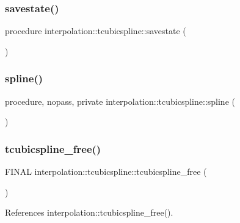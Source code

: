 \subsubsection{\texorpdfstring{savestate()}{savestate()}}
{\footnotesize\ttfamily procedure interpolation\+::tcubicspline\+::savestate (\begin{DoxyParamCaption}{ }\end{DoxyParamCaption})}

\mbox{\label{structinterpolation_1_1tcubicspline_ab13d6a8135c14c075069e89f0727eb0d}} 
\subsubsection{\texorpdfstring{spline()}{spline()}}
{\footnotesize\ttfamily procedure, nopass, private interpolation\+::tcubicspline\+::spline (\begin{DoxyParamCaption}{ }\end{DoxyParamCaption})\hspace{0.3cm}{\ttfamily [private]}}

\mbox{\label{structinterpolation_1_1tcubicspline_ab4de3dd4dec20d9bd54e7668989fe15e}} 
\subsubsection{\texorpdfstring{tcubicspline\+\_\+free()}{tcubicspline\_free()}}
{\footnotesize\ttfamily F\+I\+N\+AL interpolation\+::tcubicspline\+::tcubicspline\+\_\+free (\begin{DoxyParamCaption}{ }\end{DoxyParamCaption})\hspace{0.3cm}{\ttfamily [final]}}



References interpolation\+::tcubicspline\+\_\+free().

